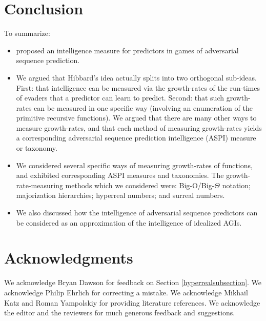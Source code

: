 \documentclass[twoside,11pt]{article}
\begin{document}
\section{Conclusion}
\label{conclusionsection}

To summarize:
\begin{itemize}
    \item
    \citet{hibbard} proposed an intelligence measure for predictors
    in games of adversarial sequence prediction.
    \item
    We argued that Hibbard's idea actually splits into two orthogonal sub-ideas.
    First: that intelligence can be measured via the growth-rates of the run-times
    of evaders that a predictor can learn to predict. Second: that such growth-rates can
    be measured in one specific way (involving an enumeration of the primitive recursive
    functions). We argued that there are many other ways to measure growth-rates,
    and that each method of measuring growth-rates yields a corresponding
    adversarial sequence prediction intelligence (ASPI) measure or taxonomy.
    \item
    We considered several specific ways of measuring growth-rates of functions, and exhibited
    corresponding ASPI measures and taxonomies. The growth-rate-measuring methods
    which we considered were: Big-O/Big-$\Theta$ notation; majorization hierarchies;
    hyperreal numbers; and surreal numbers.
    \item
    We also discussed how the intelligence of adversarial sequence predictors
    can be considered as an approximation of the intelligence of idealized AGIs.
\end{itemize}

\section*{Acknowledgments}

We acknowledge Bryan Dawson for feedback on Section \ref{hyperrealsubsection}.
We acknowledge Philip Ehrlich for correcting a mistake.
We acknowledge Mikhail Katz and Roman Yampolskiy for providing literature references.
We acknowledge the editor and the reviewers for much generous feedback and suggestions.

%

\end{document}
